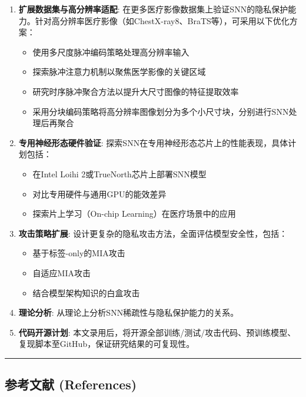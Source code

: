 \documentclass[
]{article}
\providecommand{\tightlist}{%
  \setlength{\itemsep}{0pt}\setlength{\parskip}{0pt}}
\begin{document}
\begin{enumerate}
\def\labelenumi{\arabic{enumi}.}
\item
  \textbf{扩展数据集与高分辨率适配}:
  在更多医疗影像数据集上验证SNN的隐私保护能力。针对高分辨率医疗影像（如ChestX-ray8、BraTS等），可采用以下优化方案：

  \begin{itemize}
  \tightlist
  \item
    使用多尺度脉冲编码策略处理高分辨率输入
  \item
    探索脉冲注意力机制以聚焦医学影像的关键区域
  \item
    研究时序脉冲聚合方法以提升大尺寸图像的特征提取效率
  \item
    采用分块编码策略将高分辨率图像划分为多个小尺寸块，分别进行SNN处理后再聚合
  \end{itemize}
\item
  \textbf{专用神经形态硬件验证}:
  探索SNN在专用神经形态芯片上的性能表现，具体计划包括：

  \begin{itemize}
  \tightlist
  \item
    在Intel Loihi 2或TrueNorth芯片上部署SNN模型
  \item
    对比专用硬件与通用GPU的能效差异
  \item
    探索片上学习（On-chip Learning）在医疗场景中的应用
  \end{itemize}
\item
  \textbf{攻击策略扩展}:
  设计更复杂的隐私攻击方法，全面评估模型安全性，包括：

  \begin{itemize}
  \tightlist
  \item
    基于标签-only的MIA攻击
  \item
    自适应MIA攻击
  \item
    结合模型架构知识的白盒攻击
  \end{itemize}
\item
  \textbf{理论分析}: 从理论上分析SNN稀疏性与隐私保护能力的关系。
\item
  \textbf{代码开源计划}:
  本文录用后，将开源全部训练/测试/攻击代码、预训练模型、复现脚本至GitHub，保证研究结果的可复现性。
\end{enumerate}

\begin{center}\rule{0.5\linewidth}{0.5pt}\end{center}

\subsection{参考文献
(References)}\label{ux53c2ux8003ux6587ux732e-references}
\end{document}
